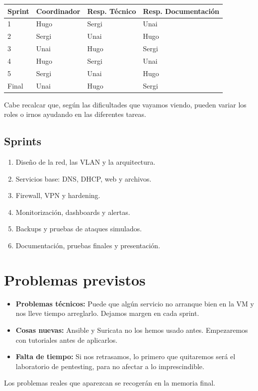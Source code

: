 \documentclass[12pt,a4paper]{article}
\begin{document}
\begin{longtable}{|p{}|p{}|p{}|p{}|}
\hline
\textbf{Sprint} & \textbf{Coordinador} & \textbf{Resp. Técnico} & \textbf{Resp. Documentación}\\ \hline
1 & Hugo & Sergi & Unai\\ \hline
2 & Sergi & Unai & Hugo\\ \hline
3 & Unai & Hugo & Sergi\\ \hline
4 & Hugo & Sergi & Unai\\ \hline
5 & Sergi & Unai & Hugo\\ \hline
Final & Unai & Hugo & Sergi\\ \hline
\end{longtable}

Cabe recalcar que, según las dificultades que vayamos viendo, pueden variar los roles o irnos ayudando en las diferentes tareas.

\subsection{Sprints}
\begin{enumerate}
\item Diseño de la red, las VLAN y la arquitectura.
\item Servicios base: DNS, DHCP, web y archivos.
\item Firewall, VPN y hardening.
\item Monitorización, dashboards y alertas.
\item Backups y pruebas de ataques simulados.
\item Documentación, pruebas finales y presentación.
\end{enumerate}

\section{Problemas previstos}
\begin{itemize}
\item \textbf{Problemas técnicos:} Puede que algún servicio no arranque bien en la VM y nos lleve tiempo arreglarlo. Dejamos margen en cada sprint.
\item \textbf{Cosas nuevas:} Ansible y Suricata no los hemos usado antes. Empezaremos con tutoriales antes de aplicarlos.
\item \textbf{Falta de tiempo:} Si nos retrasamos, lo primero que quitaremos será el laboratorio de pentesting, para no afectar a lo imprescindible.
\end{itemize}
Los problemas reales que aparezcan se recogerán en la memoria final.
\end{document}
